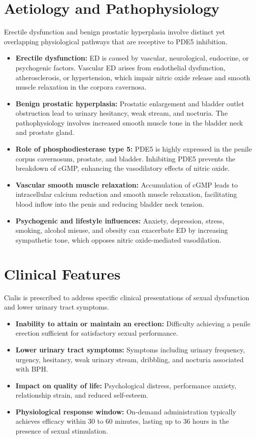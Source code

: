 \section*{Aetiology and Pathophysiology}
Erectile dysfunction and benign prostatic hyperplasia involve distinct yet overlapping physiological pathways that are receptive to PDE5 inhibition.
\begin{itemize}
    \item \textbf{Erectile dysfunction:} ED is caused by vascular, neurological, endocrine, or psychogenic factors. Vascular ED arises from endothelial dysfunction, atherosclerosis, or hypertension, which impair nitric oxide release and smooth muscle relaxation in the corpora cavernosa.
    \item \textbf{Benign prostatic hyperplasia:} Prostatic enlargement and bladder outlet obstruction lead to urinary hesitancy, weak stream, and nocturia. The pathophysiology involves increased smooth muscle tone in the bladder neck and prostate gland.
    \item \textbf{Role of phosphodiesterase type 5:} PDE5 is highly expressed in the penile corpus cavernosum, prostate, and bladder. Inhibiting PDE5 prevents the breakdown of cGMP, enhancing the vasodilatory effects of nitric oxide.
    \item \textbf{Vascular smooth muscle relaxation:} Accumulation of cGMP leads to intracellular calcium reduction and smooth muscle relaxation, facilitating blood inflow into the penis and reducing bladder neck tension.
    \item \textbf{Psychogenic and lifestyle influences:} Anxiety, depression, stress, smoking, alcohol misuse, and obesity can exacerbate ED by increasing sympathetic tone, which opposes nitric oxide-mediated vasodilation.
\end{itemize}

\section*{Clinical Features}
Cialis is prescribed to address specific clinical presentations of sexual dysfunction and lower urinary tract symptoms.
\begin{itemize}
    \item \textbf{Inability to attain or maintain an erection:} Difficulty achieving a penile erection sufficient for satisfactory sexual performance.
    \item \textbf{Lower urinary tract symptoms:} Symptoms including urinary frequency, urgency, hesitancy, weak urinary stream, dribbling, and nocturia associated with BPH.
    \item \textbf{Impact on quality of life:} Psychological distress, performance anxiety, relationship strain, and reduced self-esteem.
    \item \textbf{Physiological response window:} On-demand administration typically achieves efficacy within 30 to 60 minutes, lasting up to 36 hours in the presence of sexual stimulation.
\end{itemize}

